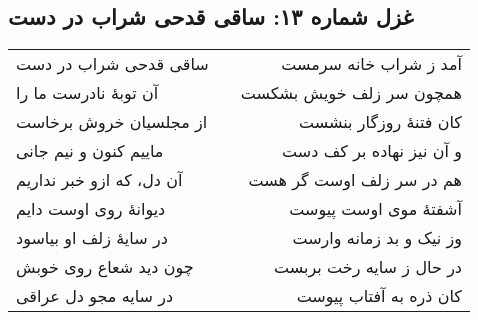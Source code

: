 \begin{center}
\section*{غزل شماره ۱۳: ساقی قدحی شراب در دست}
\label{sec:013}
\begin{longtable}{l p{0.5cm} r}
ساقی قدحی شراب در دست
&&
آمد ز شراب خانه سرمست
\\
آن توبهٔ نادرست ما را
&&
همچون سر زلف خویش بشکست
\\
از مجلسیان خروش برخاست
&&
کان فتنهٔ روزگار بنشست
\\
ماییم کنون و نیم جانی
&&
و آن نیز نهاده بر کف دست
\\
آن دل، که ازو خبر نداریم
&&
هم در سر زلف اوست گر هست
\\
دیوانهٔ روی اوست دایم
&&
آشفتهٔ موی اوست پیوست
\\
در سایهٔ زلف او بیاسود
&&
وز نیک و بد زمانه وارست
\\
چون دید شعاع روی خوبش
&&
در حال ز سایه رخت بربست
\\
در سایه مجو دل عراقی
&&
کان ذره به آفتاب پیوست
\\
\end{longtable}
\end{center}

